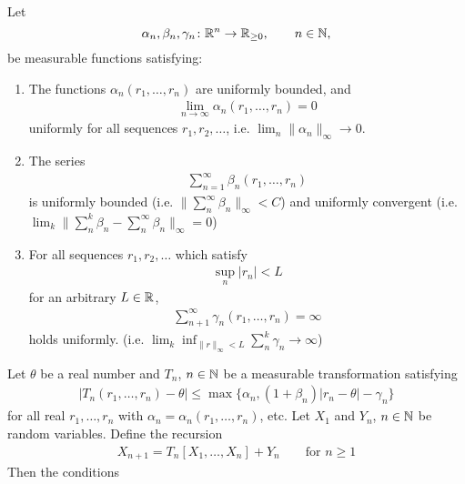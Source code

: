 \begin{thm}\label{dvoretzky thm}
    Let 
    \[
        \alpha_n, \beta_n,\gamma_n\colon \mathbb{R}^n \to \mathbb{R}_{\ge 0}, \qquad n\in\mathbb{N},
    \] 
    be measurable functions satisfying:
    \begin{enumerate}
        \item The functions \(\alpha_n(r_1,\dots,r_n) \) are uniformly bounded, and 
        \begin{align}\label{alpha_n property}
            \lim_{n\to\infty}\alpha_n(r_1,\dots,r_n)=0
        \end{align}
        uniformly for all sequences \(r_1,r_2,\dots\), i.e. \(\lim_n \|\alpha_n\|_\infty \to 0\).
        \item The series
        \begin{align}\label{beta_n property}
            \sum_{n=1}^\infty \beta_n(r_1,\dots, r_n)
        \end{align}
        is uniformly bounded (i.e. \(\|\sum_n^\infty \beta_n\|_\infty<C\)) and uniformly convergent (i.e. \(\lim_k\| \sum_n^k\beta_n -\sum^\infty_n\beta_n\|_\infty=0  \))
        \item For all sequences \(r_1,r_2,\dots \) which satisfy
        \begin{align}\label{sup r_n < L}
            \sup_n |r_n| < L
        \end{align}
        for an arbitrary \(L\in\mathbb{R}\),
        \begin{align}\label{gamma_n property}
            \sum_{n+1}^\infty \gamma_n(r_1,\dots,r_n)=\infty
        \end{align}
        holds uniformly. (i.e. \(\lim_k \inf_{\|r\|_\infty < L}  \sum^k_n \gamma_n \to \infty \))
    \end{enumerate}
    Let \(\theta\) be a real number and \(T_n\), \(n\in\mathbb{N}\) be a measurable transformation satisfying
    \begin{align}
        |T_n(r_1,\dots,r_n)-\theta| \le \max\{\alpha_n, (1+\beta_n)|r_n -\theta| -\gamma_n\} \label{dvoretzky: main condition}
    \end{align}
    for all real \(r_1,\dots,r_n\) with \(\alpha_n=\alpha_n(r_1,\dots,r_n)\), etc. Let \(X_1\) and \(Y_n\), \(n\in\mathbb{N}\) be random variables. Define the recursion
    \begin{align*}
        X_{n+1}=T_n[X_1,\dots,X_n] +Y_n \qquad \text{for }n\ge 1
    \end{align*}
    Then the conditions
    \begin{enumerate}

\end{enumerate}
\end{thm}
